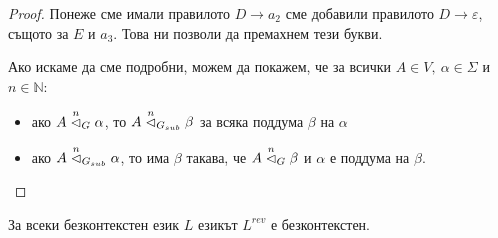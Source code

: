 \begin{proof}
    Понеже сме имали правилото $D \rightarrow a_2$ сме добавили правилото $D \rightarrow \varepsilon$, същото за $E$ и $a_3$.
    Това ни позволи да премахнем тези букви.

    Ако искаме да сме подробни, можем да покажем, че за всички $A \in V, \: \alpha \in \Sigma$ и $n \in \mathbb{N}$:

    \begin{itemize}
        \item ако $A \stackrel{n}{\vartriangleleft}_G \alpha$, то $A \stackrel{n}{\vartriangleleft}_{G_{sub}} \beta$ за всяка поддума $\beta$ на $\alpha$
        \item ако $A \stackrel{n}{\vartriangleleft}_{G_{sub}} \alpha$, то има $\beta$ такава, че $A \stackrel{n}{\vartriangleleft}_G \beta$ и $\alpha$ е поддума на $\beta$.
    \end{itemize}
\end{proof}

\begin{claim}
    За всеки безконтекстен език $L$ езикът $L^{rev}$ е безконтекстен.
\end{claim}

